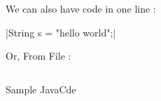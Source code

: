 \documentclass[12pt,a4paper]{article}
\begin{document}
We can also have code in one line : 
 
|String s = "hello world";|

 Or, From File : \\

 \begin{listing}[ht]
 \inputminted{java}{Main.java}
 \caption{Sample JavaCde}
 \label{listing:3}
 \end{listing}










%
%
\end{document}
